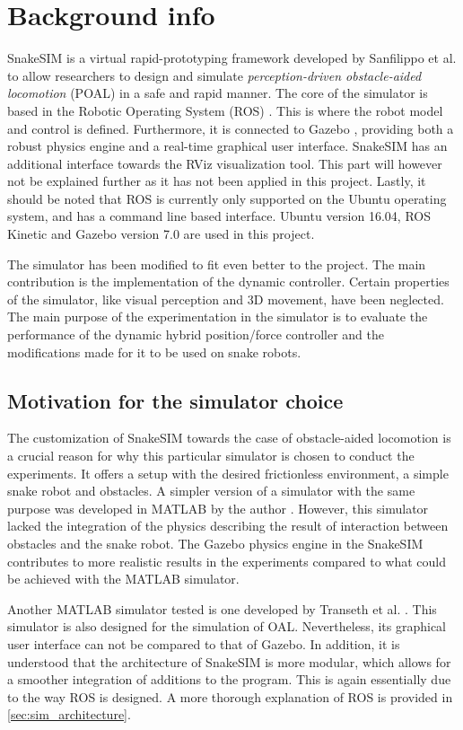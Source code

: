 \section{Background info}


SnakeSIM is a virtual rapid-prototyping framework developed by Sanfilippo et al. \cite{sanfilippo2018snakesim} to allow researchers to design and simulate \textit{perception-driven obstacle-aided locomotion} (POAL) in a safe and rapid manner. The core of the simulator is based in the Robotic Operating System (ROS) \cite{quigley2009ros}. This is where the robot model and control is defined. Furthermore, it is connected to Gazebo \cite{koenig2004design}, providing both a robust physics engine and a real-time graphical user interface. SnakeSIM has an additional interface towards the RViz visualization tool. This part will however not be explained further as it has not been applied in this project. Lastly, it should be noted that ROS is currently only supported on the Ubuntu operating system, and has a command line based interface. Ubuntu version 16.04, ROS Kinetic and Gazebo version 7.0 are used in this project.

The simulator has been modified to fit even better to the project. The main contribution is the implementation of the dynamic controller. Certain properties of the simulator, like visual perception and 3D movement, have been neglected.
The main purpose of the experimentation in the simulator is to evaluate the performance of the dynamic hybrid position/force controller and the modifications made for it to be used on snake robots. 

\subsection{Motivation for the simulator choice}

The customization of SnakeSIM towards the case of obstacle-aided locomotion is a crucial reason for why this particular simulator is chosen to conduct the experiments. It offers a setup with the desired frictionless environment, a simple snake robot and obstacles. A simpler version of a simulator with the same purpose was developed in MATLAB by the author \cite{AtussaProsjektoppgp}. However, this simulator lacked the integration of the physics describing the result of interaction between obstacles and the snake robot. The Gazebo physics engine in the SnakeSIM contributes to more realistic results in the experiments compared to what could be achieved with the MATLAB simulator.

Another MATLAB simulator tested is one developed by Transeth et al. \cite{transeth2008snake}. This simulator is also designed for the simulation of OAL. Nevertheless, its graphical user interface can not be compared to that of Gazebo. In addition, it is understood that the architecture of SnakeSIM is more modular, which allows for a smoother integration of additions to the program. This is again essentially due to the way ROS is designed. A more thorough explanation of ROS is provided in \ref{sec:sim_architecture}.